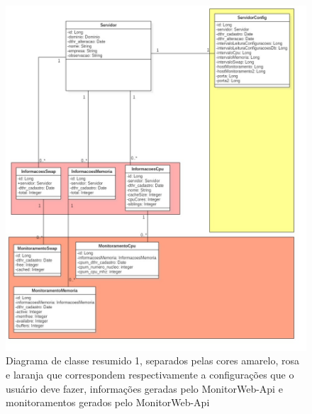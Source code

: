 \begin{figure}[H]
	\centering
	\includegraphics[width=1.0\textwidth]{figuras/DiagramaDeClassResumidoDoResumo.jpg}
	\caption[Diagrama de classe resumido 1.]{Diagrama de classe resumido 1, separados pelas cores amarelo, rosa e laranja que correspondem respectivamente a configurações que o usuário deve fazer, informações geradas pelo MonitorWeb-Api e monitoramentos gerados pelo MonitorWeb-Api}
	\label{Img:DiagramaDeClassResumidoDoResumo}
	
\end{figure}







